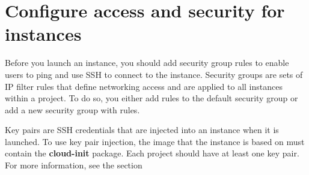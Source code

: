 \chapter{Configure access and security for instances}

Before you launch an \gls{instance}, you should add security group rules to
enable users to ping and use SSH to connect to the instance. Security
groups are sets of IP filter rules that define networking access and are
applied to all instances within a project. To do so, you either add
rules to the default security group or add a new security group with
rules.

Key pairs are SSH credentials that are injected into an instance when it
is launched. To use key pair injection, the image that the instance is
based on must contain the \textbf{cloud-init} package. Each project
should have at least one key pair. For more information, see the section
